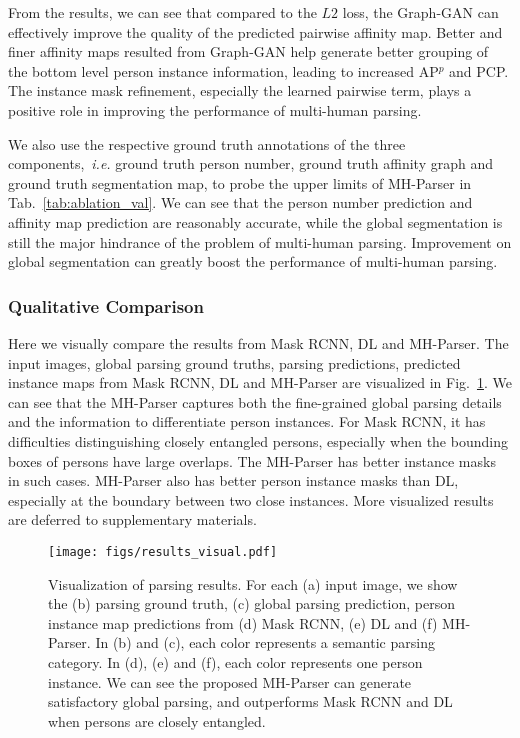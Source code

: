 \documentclass[10pt, letterpaper]{article}
\begin{document}
From the results, we can see that compared to the $L2$ loss, the Graph-GAN can effectively improve the quality of the predicted pairwise affinity map. Better and finer affinity maps resulted from Graph-GAN help generate better grouping of the bottom level person instance information, leading to increased AP$^p$ and PCP. The instance mask refinement, especially the learned pairwise term, plays a positive role in improving the performance of multi-human parsing.

We also use the respective ground truth annotations of the three components,~\emph{i.e.} ground truth person number, ground truth affinity graph and ground truth segmentation map, to probe the upper limits of MH-Parser in Tab.~\ref{tab:ablation_val}. We can see that the person number prediction and affinity map prediction are reasonably accurate, while the global segmentation is still the major hindrance of the problem of multi-human parsing. Improvement on global segmentation can greatly boost the performance of multi-human parsing.
 
\subsubsection{Qualitative Comparison}
Here we visually compare the results from Mask RCNN, DL and MH-Parser. The input images, global parsing ground truths, parsing predictions, predicted instance maps from Mask RCNN, DL and MH-Parser are visualized in Fig.~\ref{fig:visual}. We can see that the MH-Parser captures both the fine-grained global parsing details and the information to differentiate person instances. For Mask RCNN, it has difficulties distinguishing closely entangled persons, especially when the bounding boxes of persons have large overlaps. The MH-Parser has better instance masks in such cases. MH-Parser also has better person instance masks than DL, especially at the boundary between two close instances. More visualized results are deferred to supplementary materials. 

\begin{figure}[!t]
  \centering
  \texttt{[image: figs/results\_visual.pdf]}
  \caption{Visualization of parsing results. For each (a) input image, we show the (b) parsing ground truth,  (c) global parsing prediction,  person instance map predictions from (d) Mask RCNN, (e) DL and (f) MH-Parser. In (b) and (c), each color represents a semantic parsing category. In (d), (e) and (f), each color represents one person instance. We can see the proposed MH-Parser can generate satisfactory global parsing, and outperforms Mask RCNN and DL when persons are closely entangled.} \label{fig:visual}
\end{figure}
\end{document}
